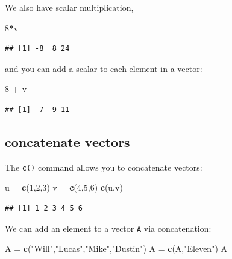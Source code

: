 \documentclass[
]{book}
\newenvironment{Shaded}{\begin{snugshade}}{\end{snugshade}}
\newcommand{\DecValTok}[1]{\textcolor[rgb]{0.00,0.00,0.81}{#1}}
\newcommand{\FunctionTok}[1]{\textcolor[rgb]{0.13,0.29,0.53}{\textbf{#1}}}
\newcommand{\NormalTok}[1]{#1}
\newcommand{\OtherTok}[1]{\textcolor[rgb]{0.56,0.35,0.01}{#1}}
\newcommand{\SpecialCharTok}[1]{\textcolor[rgb]{0.81,0.36,0.00}{\textbf{#1}}}
\newcommand{\StringTok}[1]{\textcolor[rgb]{0.31,0.60,0.02}{#1}}
\theoremstyle{definition}
\theoremstyle{definition}
\theoremstyle{definition}
\theoremstyle{definition}
\theoremstyle{remark}
\begin{document}
We also have scalar multiplication,

\begin{Shaded}
\begin{Highlighting}[]
\DecValTok{8}\SpecialCharTok{*}\NormalTok{v}
\end{Highlighting}
\end{Shaded}

\begin{verbatim}
## [1] -8  8 24
\end{verbatim}

and you can add a scalar to each element in a vector:

\begin{Shaded}
\begin{Highlighting}[]
\DecValTok{8} \SpecialCharTok{+}\NormalTok{ v}
\end{Highlighting}
\end{Shaded}

\begin{verbatim}
## [1]  7  9 11
\end{verbatim}

\subsection*{concatenate vectors}\label{concatenate-vectors}

The \texttt{c()} command allows you to concatenate vectors:

\begin{Shaded}
\begin{Highlighting}[]
\NormalTok{u }\OtherTok{=} \FunctionTok{c}\NormalTok{(}\DecValTok{1}\NormalTok{,}\DecValTok{2}\NormalTok{,}\DecValTok{3}\NormalTok{)}
\NormalTok{v }\OtherTok{=} \FunctionTok{c}\NormalTok{(}\DecValTok{4}\NormalTok{,}\DecValTok{5}\NormalTok{,}\DecValTok{6}\NormalTok{)}
\FunctionTok{c}\NormalTok{(u,v)}
\end{Highlighting}
\end{Shaded}

\begin{verbatim}
## [1] 1 2 3 4 5 6
\end{verbatim}

We can add an element to a vector \texttt{A} via concatenation:

\begin{Shaded}
\begin{Highlighting}[]
\NormalTok{A }\OtherTok{=} \FunctionTok{c}\NormalTok{(}\StringTok{"Will"}\NormalTok{,}\StringTok{"Lucas"}\NormalTok{,}\StringTok{"Mike"}\NormalTok{,}\StringTok{"Dustin"}\NormalTok{)}
\NormalTok{A }\OtherTok{=} \FunctionTok{c}\NormalTok{(A,}\StringTok{"Eleven"}\NormalTok{)}
\NormalTok{A}
\end{Highlighting}
\end{Shaded}
\end{document}
